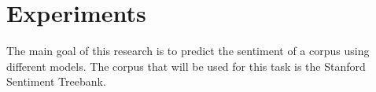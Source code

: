 \section{Experiments}
\label{sec: experiments}
The main goal of this research is to predict the sentiment of a corpus using
different models. The corpus that will be used for this task is the {Stanford
Sentiment Treebank}.